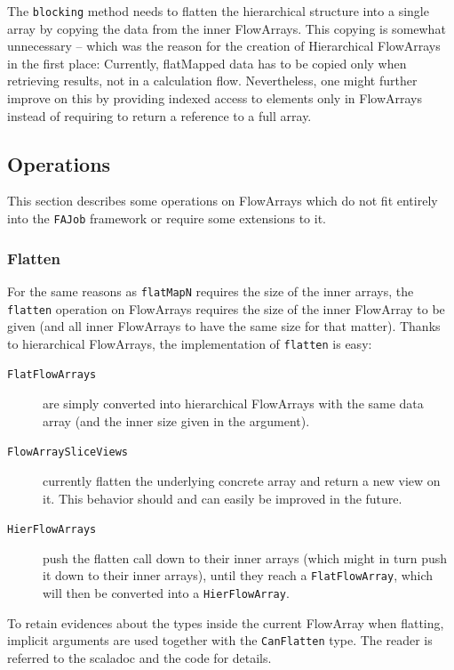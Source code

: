 \documentclass[runningheads,a4paper,fleqn]{llncs}
\begin{document}
The \texttt{blocking} method needs to flatten the hierarchical
structure into a single array by copying the data from the inner
FlowArrays. This copying is somewhat unnecessary -- which 
was the reason for the creation of Hierarchical FlowArrays in the
first place: Currently, flatMapped data has to be copied only when
retrieving results, not in a calculation flow. Nevertheless, one might
further improve on this by providing indexed access to elements only
in FlowArrays instead of requiring to return a reference to a full
array.

\subsection{Operations}
\label{ssec:imp-operations}
This section describes some operations on FlowArrays which do not fit
entirely into the \texttt{FAJob} framework or require some extensions
to it.

\subsubsection{Flatten}
For the same reasons as \texttt{flatMapN} requires the size of the
inner arrays, the \texttt{flatten} operation on FlowArrays requires
the size of the inner FlowArray to be given (and all inner FlowArrays
to have the same size for that matter). Thanks to hierarchical
FlowArrays, the implementation of \texttt{flatten} is easy:

\begin{description}
\item[\texttt{FlatFlowArrays}] are simply converted into hierarchical
  FlowArrays with the same data array (and the inner size given in the
  argument).
\item[\texttt{FlowArraySliceViews}] currently flatten the underlying
  concrete array and return a new view on it. This behavior should and
  can easily be improved in the future.
\item[\texttt{HierFlowArrays}] push the flatten call down to their
  inner arrays (which might in turn push it down to their inner
  arrays), until they reach a \texttt{FlatFlowArray}, which will then
  be converted into a \texttt{HierFlowArray}.
\end{description}

To retain evidences about the types inside the current FlowArray when
flatting, implicit arguments are used together with the
\texttt{CanFlatten} type. The reader is referred to the scaladoc and
the code for details.
\end{document}
